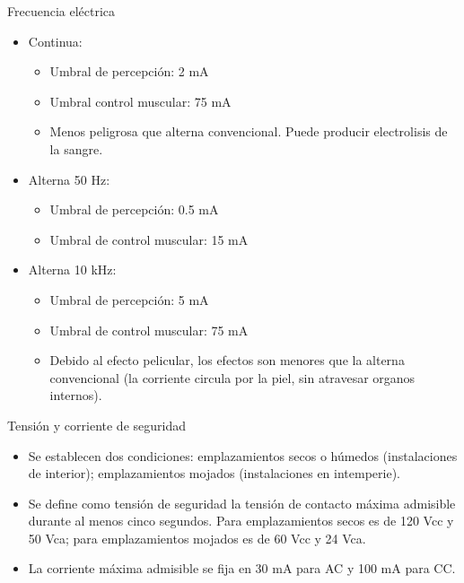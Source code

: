 \documentclass[xcolor={usenames,svgnames,dvipsnames}]{beamer}
\begin{document}
\begin{frame}[label=sec-2-1-5]{Frecuencia eléctrica}
\begin{itemize}
\item Continua:

\begin{itemize}
\item Umbral de percepción: 2 mA

\item Umbral control muscular: 75 mA

\item Menos peligrosa que alterna convencional. Puede producir
electrolisis de la sangre.
\end{itemize}

\item Alterna 50 Hz:

\begin{itemize}
\item Umbral de percepción: 0.5 mA

\item Umbral de control muscular: 15 mA
\end{itemize}

\item Alterna 10 kHz:

\begin{itemize}
\item Umbral de percepción: 5 mA

\item Umbral de control muscular: 75 mA

\item Debido al efecto pelicular, los efectos son menores que la alterna
convencional (la corriente circula por la piel, sin atravesar
organos internos).
\end{itemize}
\end{itemize}
\end{frame}

\begin{frame}[label=sec-2-1-6]{Tensión y corriente de seguridad}
\begin{itemize}
\item Se establecen dos condiciones: \alert{emplazamientos secos o húmedos}
(instalaciones de interior); \alert{emplazamientos mojados} (instalaciones
en intemperie).

\item Se define como tensión de seguridad la tensión de contacto máxima
admisible durante al menos cinco segundos. Para emplazamientos secos
es de 120 Vcc y 50 Vca; para \alert{emplazamientos mojados es de 60 Vcc y
24 Vca}.

\item \alert{La corriente máxima admisible se fija en 30 mA para AC y 100 mA para
CC}.
\end{itemize}
\end{frame}
\end{document}
